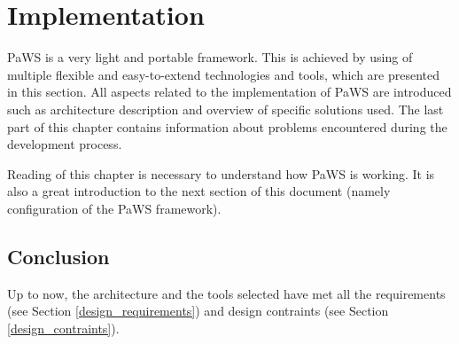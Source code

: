 \chapter{Implementation}

PaWS is a very light and portable framework. This is achieved by using of multiple flexible and easy-to-extend technologies and tools, which are presented in this section. All aspects related to the implementation of PaWS are introduced such as architecture description and overview of specific solutions used. The last part of this chapter contains information about problems encountered during the development process.

Reading of this chapter is necessary to understand how PaWS is working. It is also a great introduction to the next section of this document (namely configuration of the PaWS framework).







\section{Conclusion}

Up to now, the architecture and the tools selected have met all the requirements (see Section \ref{design_requirements}) and design contraints (see Section \ref{design_contraints}).


